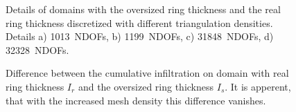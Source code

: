 \documentclass[review,times,3p,10pt]{elsarticle}
\begin{document}
{ \begin{figure}
\centering
{}
 \caption{Details of domains with the oversized ring thickness and the real ring thickness discretized with different triangulation densities. Details a) 1013~NDOFs, b) 1199~NDOFs, c) 31848~NDOFs,  d) 32328~NDOFs. }
 \label{mesh-dens}
\end{figure}

 \begin{figure}
\centering
{}
 \caption{Difference between the cumulative infiltration on domain with real ring thickness $I_r$ and the oversized ring thickness $I_s$. It is apperent, that with the increased mesh density this difference vanishes.}
 \label{mesh-errs}
\end{figure}

}
\end{document}
